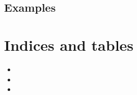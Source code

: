 \documentclass[letterpaper,10pt,english]{sphinxmanual}
\begin{document}
\section{Examples}
\label{examples::doc}\label{examples:examples}

\chapter{Indices and tables}
\label{index:indices-and-tables}\begin{itemize}
\item {} 

\item {} 

\item {} 

\end{itemize}



\renewcommand{\indexname}{Index}
\printindex
\end{document}
